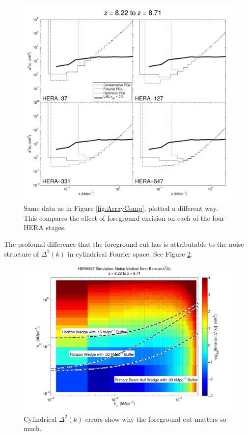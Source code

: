 \documentclass[]{article}
\begin{document}
\begin{figure} [!ht] 
	\centering 
	\includegraphics[width=1\textwidth]{HERA_Foreground_Comp.pdf}
	\caption{Same data as in Figure \ref{fig:ArrayComp}, plotted a different way.  This compares the effect of foreground excision on each of the four HERA stages.}
	\label{fig:ForegroundComp}
\end{figure}


The profound difference that the foreground cut has is attributable to the noise structure of $\Delta^2(k)$ in cylindrical Fourier space.  See Figure \ref{fig:CylDeltaSq}.
\begin{figure} [!ht] 
	\centering 
	\includegraphics[width=1\textwidth]{CylDeltaSqError.png}
	\caption{Cylindrical $\Delta^2(k)$ errors show why the foreground cut matters so much.}
	\label{fig:CylDeltaSq}
\end{figure} 
\end{document}
